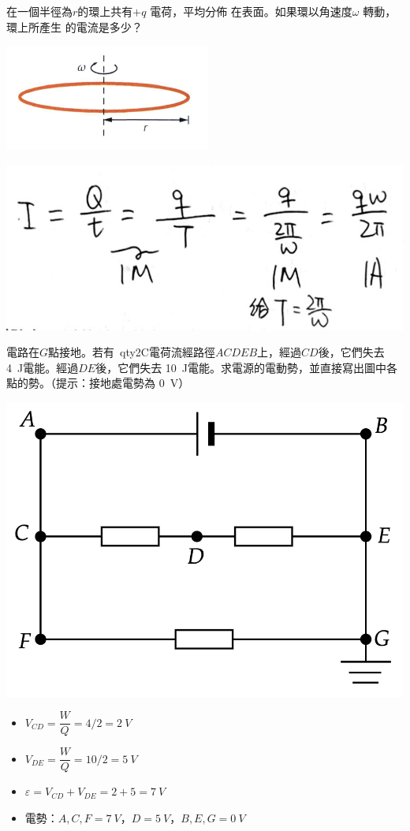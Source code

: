 {
    在一個半徑為$r$的環上共有$+q$ 電荷，平均分佈 在表面。如果環以角速度$\omega$ 轉動，環上所產生 的電流是多少？
    \par{\par\centering\includegraphics[width=.35\textwidth]{./img/ch2_circuit_lq_2024-06-14-14-33-19.png}\par}

}{
    \par{\par\centering\includegraphics[width=.7\textwidth]{./img/ch2_circuit_lq_2024-06-15-15-15-11.png}\par}
}
{
    電路在$G$點接地。若有\ qty{2}{C}電荷流經路徑$ACDEB$上，經過$CD$後，它們失去 \qty{4}{J}電能。經過$DE$後，它們失去 \qty{10}{J}電能。求電源的電動勢，並直接寫出圖中各點的勢。（提示：接地處電勢為 \qty{0}{V}）\par{}
    \par{\par\centering\includegraphics[width=.4\textwidth]{./img/ch2_circuit_lq_2024-06-14-13-59-11.png}\par}
}{
    \begin{itemize}
        \item [] $V_{CD}=\dfrac{W}{Q}=4/2=\qty{2}{V}$
        \item[]  $V_{DE}=\dfrac{W}{Q}=10/2=\qty{5}{V}$\giveM
        \item [] $\varepsilon=V_{CD}+V_{DE}=2+5=\qty{7}{V}$\giveM
        \item [] 電勢：$A, C, F=\qty{7}{V}$，$D=\qty{5}{V}$，$B, E, G=\qty{0}{V}$\giveA
    \end{itemize}
}

